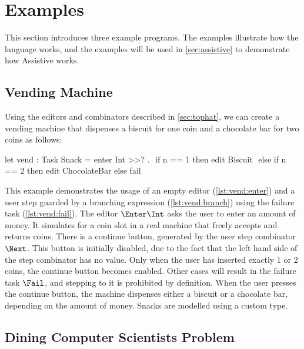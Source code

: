 
\section{Examples}
\label{sec:examples}

This section introduces three example \TOPHAT programs.
The examples illustrate how the \TOPHAT language works, and the examples will be used in \cref{sec:assistive} to demonstrate how Assistive \TOPHAT works.


\subsection{Vending Machine}

Using the editors and combinators described in \cref{sec:tophat},
we can create a vending machine that dispenses a biscuit for one coin and a chocolate bar for two coins as follows:


\begin{TASK}[
    float=ht,
    numbers=right,
    caption={Vending machine dispensing biscuits or chocolate.},
    label=lst:dining]
  let vend : Task Snack = enter Int >>? \n. $\label{lst:vend:enter}$
    if n == 1 then edit Biscuit             $\label{lst:vend:branch}$
    else if n == 2 then edit ChocolateBar
    else fail                               $\label{lst:vend:fail}$
\end{TASK}

This example demonstrates the usage of an empty editor (\cref{lst:vend:enter}) and
a user step guarded by a branching expression (\cref{lst:vend:branch}) using the failure task (\cref{lst:vend:fail}).
The editor $\Enter \Int$ asks the user to enter an amount of money.
It simulates for a coin slot in a real machine that freely accepts and returns coins.
There is a continue button, generated by the user step combinator $\Next$.
This button is initially disabled, due to the fact that the left hand side of the step combinator has no value.
Only when the user has inserted exactly 1 or 2 coins, the continue button becomes enabled.
Other cases will result in the failure task $\Fail$, and stepping to it is prohibited by definition.
When the user presses the continue button, the machine dispenses either a biscuit or a chocolate bar, depending on the amount of money.
Snacks are modelled using a custom type.


\subsection{Dining Computer Scientists Problem}
\label{sec:dining}

